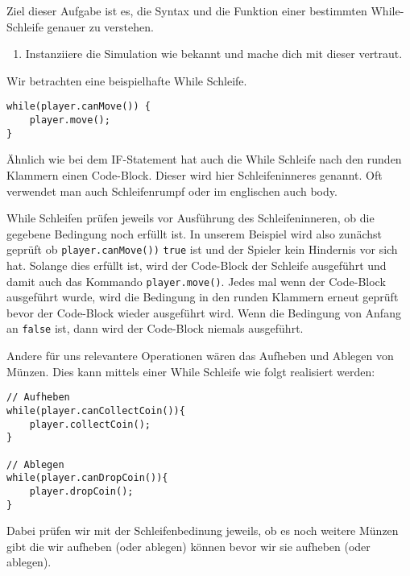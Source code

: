 

Ziel dieser Aufgabe ist es, die Syntax und die Funktion einer bestimmten While-Schleife genauer zu verstehen.

\begin{enumerate}
    \item Instanziiere die Simulation wie bekannt und mache dich mit dieser vertraut.
\end{enumerate}


\begin{Infobox}
    Wir betrachten eine beispielhafte While Schleife.

    \begin{lstlisting}[breaklines=true, numbers=none]
while(player.canMove()) {
    player.move();
}
    \end{lstlisting}

    Ähnlich wie bei dem IF-Statement hat auch die While Schleife nach den runden Klammern einen Code-Block.
    Dieser wird hier Schleifeninneres genannt.
    Oft verwendet man auch Schleifenrumpf oder im englischen auch body.

    While Schleifen prüfen jeweils vor Ausführung des Schleifeninneren, ob die gegebene Bedingung noch erfüllt ist. 
    In unserem Beispiel wird also zunächst geprüft ob \lstinline{player.canMove())} \lstinline{true} ist und der Spieler kein Hindernis vor sich hat. 
    Solange dies erfüllt ist, wird der Code-Block der Schleife ausgeführt und damit auch das Kommando \lstinline{player.move()}.
    Jedes mal wenn der Code-Block ausgeführt wurde, wird die Bedingung in den runden Klammern erneut geprüft bevor der Code-Block wieder ausgeführt wird.
    Wenn die Bedingung von Anfang an \lstinline{false} ist, dann wird der Code-Block niemals ausgeführt.
    
    Andere für uns relevantere Operationen wären das Aufheben und Ablegen von Münzen. 
    Dies kann mittels einer While Schleife wie folgt realisiert werden:

    \begin{lstlisting}[breaklines=true, numbers=none]
// Aufheben
while(player.canCollectCoin()){
    player.collectCoin();
}

// Ablegen
while(player.canDropCoin()){
    player.dropCoin();
}
    \end{lstlisting}

    Dabei prüfen wir mit der Schleifenbedinung jeweils, ob es noch weitere Münzen gibt die wir aufheben (oder ablegen) können bevor wir sie aufheben (oder ablegen).
\end{Infobox}


